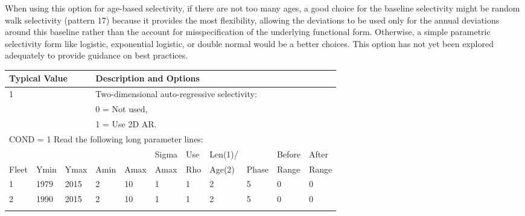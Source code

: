 When using this option for age-based selectivity, if there are not too many ages, a good choice for the baseline selectivity might be random walk selectivity (pattern 17) because it provides the most flexibility, allowing the deviations to be used only for the annual deviations around this baseline rather than the account for misspecification of the underlying functional form. Otherwise, a simple parametric selectivity form like logistic, exponential logistic, or double normal would be a better choices. This option has not yet been explored adequately to provide guidance on best practices.

\begin{longtable}{p{1cm} p{1cm} p{1cm} p{1.25cm} p{1.25cm} p{1.25cm} p{1.2cm} p{1.2cm} p{1cm} p{1cm} p{1cm}}
		
	\multicolumn{3}{l}{Typical Value} &  \multicolumn{8}{l}{Description and Options} \\
	\hline

	\multicolumn{3}{l}{1} & \multicolumn{8}{l}{Two-dimensional auto-regressive selectivity:}\Tstrut\\
	\multicolumn{3}{l}{ } & \multicolumn{8}{l}{0 = Not used,}\\
	\multicolumn{3}{l}{ } & \multicolumn{8}{l}{1 = Use 2D AR.}\Tstrut\\

	\multicolumn{11}{l}{COND = 1 Read the following long parameter lines:}\\
	\hline
	\Tstrut &    &      &      &      & Sigma & Use & Len(1)/ &       & Before & After\\
	Fleet & Ymin & Ymax & Amin & Amax & Amax  & Rho & Age(2)  & Phase & Range  & Range\Bstrut\\
	\hline
	   1    & 1979 & 2015 &  2   &  10  & 1     & 1   & 2       & 5     & 0   & 0\Tstrut\\
	   2    & 1990 & 2015 &  2   &  10  & 1     & 1   & 2       & 5     & 0   & 0 \Bstrut\\
	\hline
	\\
	

\end{longtable}
